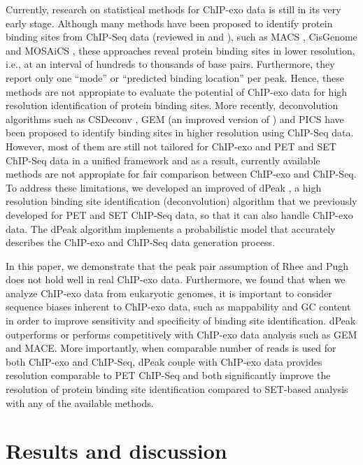 \documentclass{bmcart}\usepackage[]{graphicx}\usepackage[]{color}
\begin{document}
Currently, research on statistical methods for ChIP-exo data is still
in its very early stage. Although many methods have been proposed to
identify protein binding sites from ChIP-Seq data (reviewed in
\cite{evaluation} and \cite{computation}), such as MACS \cite{macs},
CisGenome \cite{cisgenome} and MOSAiCS \cite{mosaics}, these
approaches reveal protein binding sites in lower resolution, i.e., at
an interval of hundreds to thousands of base pairs. Furthermore, they
report only one ``mode'' or ``predicted binding location'' per
peak. Hence, these methods are not appropiate to evaluate the
potential of ChIP-exo data for high resolution identification of
protein binding sites. More recently, deconvolution algorithms such as
CSDeconv \cite{csdeconv}, GEM \cite{gem} (an improved version of
\cite{gps}) and PICS \cite{pics} have been proposed to identify
binding sites in higher resolution using ChIP-Seq data. However, most
of them are still not tailored for ChIP-exo and PET and SET ChIP-Seq
data in a unified framework and as a result, currently available
methods are not appropiate for fair comparison between ChIP-exo and
ChIP-Seq. To address these limitations, we developed an improved of
dPeak \cite{dpeak}, a high resolution binding site identification
(deconvolution) algorithm that we previously developed for PET and SET
ChIP-Seq data, so that it can also handle ChIP-exo data. The dPeak
algorithm implements a probabilistic model that accurately describes
the ChIP-exo and ChIP-Seq data generation process.

In this paper, we demonstrate that the peak pair assumption of Rhee
and Pugh \cite{exo1} does not hold well in real ChIP-exo
data. Furthermore, we found that when we analyze ChIP-exo data from
eukaryotic genomes, it is important to consider sequence biases
inherent to ChIP-exo data, such as mappability and GC content in order
to improve sensitivity and specificity of binding site
identification. dPeak outperforms or performs competitively with
ChIP-exo data analysis such as GEM and MACE. More importantly, when
comparable number of reads is used for both ChIP-exo and ChIP-Seq,
dPeak couple with ChIP-exo data provides resolution comparable to PET
ChIP-Seq and both significantly improve the resolution of protein
binding site identification compared to SET-based analysis with any of
the available methods.

\newpage

\section{Results and discussion}
\label{sec:results}
\end{document}
